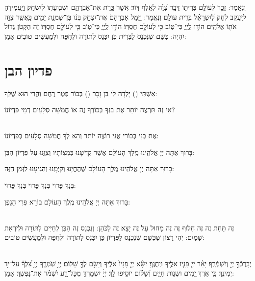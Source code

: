 \documentclass[twoside, openany, parskip=half, 11pt]{book}
\begin{document}
 
וְנֶאֱמַר: זָכַ֣ר לְעוֹלָ֣ם בְּרִית֑וֹ דָּבָ֥ר צִ֝וָּ֗ה לְאֶ֣לֶף דּֽוֹר׃ אֲשֶׁ֣ר כָּ֭רַת אֶת־אַבְרָהָ֑ם 
וּשְׁב֖וּעָת֣וֹ לְיִשְׂחָֽק׃ וַיַּֽעֲמִידֶ֣הָ לְיַֽעֲקֹ֣ב לְחֹ֑ק לְ֝יִשְׂרָאֵ֗ל בְּרִ֣ית עוֹלָֽם׃
 וְנֶאֱמַר: וַיָּ֤מָל אַבְרָהָם֙ אֶת־יִצְחָ֣ק בְּנ֔וֹ בֶּן־שְׁמֹנַ֖ת יָמִ֑ים כַּֽאֲשֶׁ֛ר צִוָּ֥ה אֹת֖וֹ אֱלֹהִֽים׃ הוֹד֣וּ לַֽיְיָ֑ כִּי־ט֑וֹב כִּ֖י לְעוֹלָ֣ם חַסְדּֽוֹ׃ 
 הוֹד֣וּ לַֽיְיָ֑ כִּי־ט֑וֹב כִּ֖י לְעוֹלָ֣ם חַסְדּֽוֹ׃
 זֶה הַקָּטֹן גָּדוֹל יִהְיֶה: 
כְּשֵׁם שֶׁנִּכְנַס לַבְּרִית  כֵּן יִכָּנֵס לְתוֹרָה  וּלְחֻפָּה  וּלְמַעֲשִׂים טוֹבִים  אָמֵן:

\vfill
\sepline

\chapter[פדיון הבן]{ פדיון הבן }


אִשְׁתִּי () יָלְדָה לִי בֵּן זָכָר ()  בְּכוֹר  פֶּטֶר רֶחֶם  וַהֲרֵי הוּא שֶׁלְךָ:

אֵי זֶה תִּרְצֶה יוֹתֵר  אֶת בִּנְךָ בְּכוֹרֶךָ זֶה  אוֹ חֲמִשָׁה סְלָעִים דְמֵי פִּדְיוֹנוֹ?

\\
אֶת בְּנִי בְּכוֹרִי אֲנִי רוֹצֶה יוֹתֵר  וְהֵא לְךָ חֲמִשָׁה סְלָעִים בְּפִדְיוֹנוֹ:

בָּרוּךְ אַתָּה יְיָ אֱלֹהֵֽינוּ מֶֽלֶךְ הָעוֹלָם  אֲשֶׁר קִדְּשָׁנוּ בְּמִצְוֹתָיו  וְצִוָּֽנוּ עַל פִּדְיוֹן הַבֵּן:

בָּרוּךְ אַתָּה יְיָ אֱלֹהֵֽינוּ מֶֽלֶךְ הָעוֹלָם  שֶׁהֶחֱיָנוּ וְקִיְּמָֽנוּ וְהִגִּיעָנוּ לַזְּמַן הַזֶּה:


בִּנְךָ פָּדוּי  בִּנְךָ פָּדוּי  בִּנְךָ פָּדוּי:

בָּרוּךְ אַתָּה יְיָ אֱלֹהֵֽינוּ מֶֽלֶךְ הָעוֹלָם  בּוֹרֵא פְּרִי הַגָפֶן:

 \\
זֶה תַּחַת זֶה  זֶה חִלוּף זֶה  זֶה מָחוּל עַל זֶה  יָצָא זֶה לַכֹּהֵן: 
וְנִכְנַס זֶה הַבֵּן לְחַיִּים  לַתּוֹרָה וּלְיִרְאַת שָׁמָיִם: 
יְהִי רָצוֹן שֶׁכְּשֵׁם שֶׁנִכְנַס לַפִּדְיוֹן כֵּן יִכָּנֵס לַתוֹרָה וּלְחֻפָּה וּלְמַעֲשִׂים טוֹבִים:

\\
יְבָֽרֶכְֿךָ֣	 יְיָ֖ 	וְיִשְׁמְֿרֶֽךָ׃ יָאֵ֨ר יְיָ֧ פָּנָ֛יו אֵלֶ֖יךָ וִֽיחֻנֶּֽךָּ׃ יִשָּׂ֨א יְיָ֤ פָּנָיו֙ אֵלֶ֔יךָ וְיָשֵׂ֥ם לְךָ֖ שָׁלֽוֹם׃
 יְיָ֥ שֹֽׁמְרֶ֑ךָ יְיָ֥ צִ֝לְּךָ֗ עַל־יַ֥ד יְמִינֶֽךָ׃ 
כִּ֤י אֹ֣רֶךְ יָ֭מִים וּשְׁנ֣וֹת חַיִּ֑ים וְ֝שָׁל֗וֹם יוֹסִ֥יפוּ לָֽךְ׃ 
יְיָׄ יִשְׁמָרְךָ֥ מִכָּל־רָ֑ע יִ֝שְׁמֹ֗ר אֶת־נַפְשֶֽׁךָ׃ אָמֵן:
\end{document}
